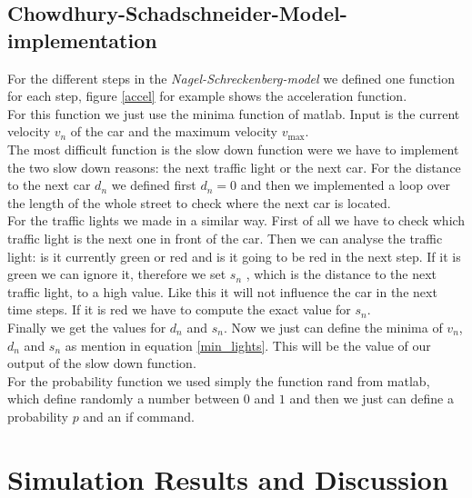 \documentclass[11pt]{article}
\begin{document}
\subsection{Chowdhury-Schadschneider-Model-implementation}
For the different steps in the \textit{Nagel-Schreckenberg-model} we defined one function for each step, figure \ref{accel} for example shows the acceleration function.\\
For this function we just use the minima function of matlab. Input is the current velocity $v_n$ of the car and the maximum velocity $v_\mathrm{max}$.
\\
The most difficult function is the slow down function were we have to implement the two slow down reasons: the next traffic light or the next car. For the distance to the next car $d_n$ we defined first $d_n=0$ and then we implemented a loop over the length of the whole street to check where the next car is located.\\
For the traffic lights we made in a similar way. First of all we have to check which traffic light is the next one in front of the car. Then we can analyse the traffic light: is it currently green or red and is it going to be red in the next step. If it is green we can ignore it, therefore we set $s_n$ , which is the distance to the next traffic light, to a high value. Like this it will not influence the car in the next time steps. If it is red we have to compute the exact value for $s_n$.\\
Finally we get the values for $d_n$ and $s_n$. Now we just can define the minima of $v_n$, $d_n$ and $s_n$ as mention in equation \ref{min_lights}. This will be the value of our output of the slow down function.\\
For the probability function we used simply the function rand from matlab, which define randomly a number between $0$ and $1$ and then we just can define a probability $p$ and an if command.\\



\section{Simulation Results and Discussion}
\end{document}
